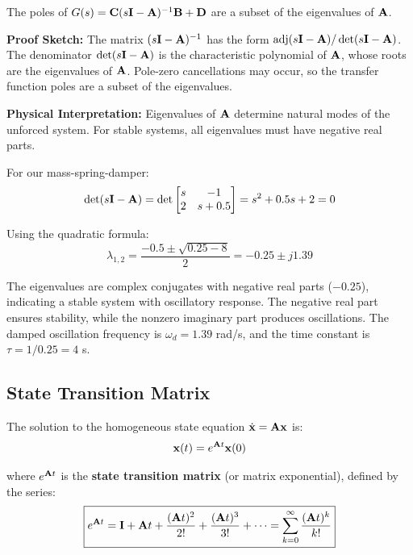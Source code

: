 \begin{theorem}
The poles of $G(s) = \mathbf{C}(s\mathbf{I}-\mathbf{A})^{-1}\mathbf{B} + \mathbf{D}$ are a subset of the eigenvalues of $\mathbf{A}$.
\end{theorem}

\textbf{Proof Sketch:} The matrix $(s\mathbf{I}-\mathbf{A})^{-1}$ has the form $\text{adj}(s\mathbf{I}-\mathbf{A})/\det(s\mathbf{I}-\mathbf{A})$. The denominator $\det(s\mathbf{I}-\mathbf{A})$ is the characteristic polynomial of $\mathbf{A}$, whose roots are the eigenvalues of $\mathbf{A}$. Pole-zero cancellations may occur, so the transfer function poles are a subset of the eigenvalues.

\textbf{Physical Interpretation:} Eigenvalues of $\mathbf{A}$ determine natural modes of the unforced system. For stable systems, all eigenvalues must have negative real parts.

\begin{example}
For our mass-spring-damper:
\begin{equation}
    \det(s\mathbf{I} - \mathbf{A}) = \det\begin{bmatrix} s & -1 \\ 2 & s+0.5 \end{bmatrix} = s^2 + 0.5s + 2 = 0
\end{equation}

Using the quadratic formula:
\begin{equation}
    \lambda_{1,2} = \frac{-0.5 \pm \sqrt{0.25 - 8}}{2} = -0.25 \pm j1.39
\end{equation}

The eigenvalues are complex conjugates with negative real parts ($-0.25$), indicating a stable system with oscillatory response. The negative real part ensures stability, while the nonzero imaginary part produces oscillations. The damped oscillation frequency is $\omega_d = 1.39$ rad/s, and the time constant is $\tau = 1/0.25 = 4$ s.
\end{example}

\subsection{State Transition Matrix}

The solution to the homogeneous state equation $\dot{\mathbf{x}} = \mathbf{A}\mathbf{x}$ is:
\begin{equation}
    \mathbf{x}(t) = e^{\mathbf{A}t}\mathbf{x}(0)
\end{equation}

where $e^{\mathbf{A}t}$ is the \textbf{state transition matrix} (or matrix exponential), defined by the series:
\begin{equation}
\boxed{
    e^{\mathbf{A}t} = \mathbf{I} + \mathbf{A}t + \frac{(\mathbf{A}t)^2}{2!} + \frac{(\mathbf{A}t)^3}{3!} + \cdots = \sum_{k=0}^{\infty} \frac{(\mathbf{A}t)^k}{k!}
}
\end{equation}

